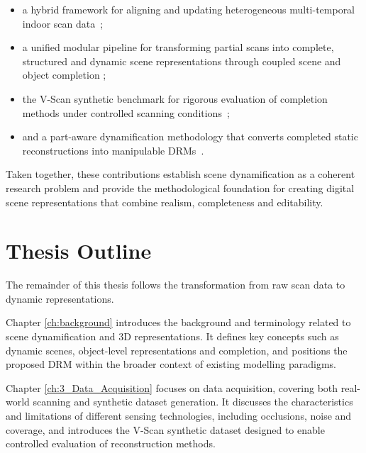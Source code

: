 \begin{itemize}
    \item a hybrid framework for aligning and updating heterogeneous multi-temporal indoor scan data~\cite{vermandere_two-step_2022, vermandere_automatic_2022};
    
    \item a unified modular pipeline for transforming partial scans into complete, structured and dynamic scene representations through coupled scene and object completion \cite{vermandere_guided_2025};
    
    \item the V-Scan synthetic benchmark for rigorous evaluation of completion methods under controlled scanning conditions~\cite{vermandere_synthetic_2026};
    
    \item and a part-aware dynamification methodology that converts completed static reconstructions into manipulable \gls{DRM}s~\cite{vermandere_geometry_2025, vermandere_adaptive_2026}.
\end{itemize}

Taken together, these contributions establish scene dynamification as a coherent research problem and provide the methodological foundation for creating digital scene representations that combine realism, completeness and editability.

\section{Thesis Outline}

The remainder of this thesis follows the transformation from raw scan data to dynamic representations.

Chapter \ref{ch:background} introduces the background and terminology related to scene dynamification and 3D representations. It defines key concepts such as dynamic scenes, object-level representations and completion, and positions the proposed \gls{DRM} within the broader context of existing modelling paradigms.

Chapter \ref{ch:3_Data_Acquisition} focuses on data acquisition, covering both real-world scanning and synthetic dataset generation. It discusses the characteristics and limitations of different sensing technologies, including occlusions, noise and coverage, and introduces the V-Scan synthetic dataset designed to enable controlled evaluation of reconstruction methods.

